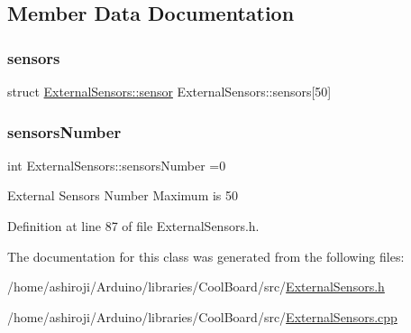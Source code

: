 \subsection{Member Data Documentation}
\mbox{\label{class_external_sensors_a284233f884fcf00154a44740cf1d9e1e}} 
\subsubsection{\texorpdfstring{sensors}{sensors}}
{\footnotesize\ttfamily struct \hyperlink{struct_external_sensors_1_1sensor}{External\+Sensors\+::sensor} External\+Sensors\+::sensors\mbox{[}50\mbox{]}\hspace{0.3cm}{\ttfamily [private]}}

\mbox{\label{class_external_sensors_a58e4fbf9adeae787d92be5fa33043b5d}} 
\subsubsection{\texorpdfstring{sensors\+Number}{sensorsNumber}}
{\footnotesize\ttfamily int External\+Sensors\+::sensors\+Number =0\hspace{0.3cm}{\ttfamily [private]}}

External Sensors Number Maximum is 50 

Definition at line 87 of file External\+Sensors.\+h.



The documentation for this class was generated from the following files\+:\begin{DoxyCompactItemize}
\item 
/home/ashiroji/\+Arduino/libraries/\+Cool\+Board/src/\hyperlink{_external_sensors_8h}{External\+Sensors.\+h}\item 
/home/ashiroji/\+Arduino/libraries/\+Cool\+Board/src/\hyperlink{_external_sensors_8cpp}{External\+Sensors.\+cpp}\end{DoxyCompactItemize}
